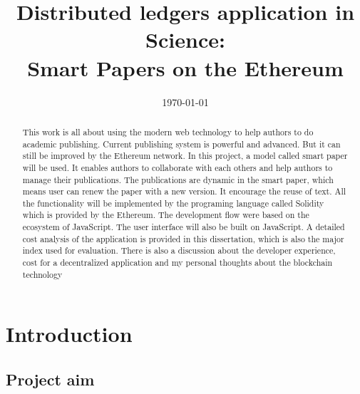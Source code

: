 \documentclass[openany,12pt]{ecsthesis}      %
\begin{document}
\frontmatter
\title      {Distributed ledgers application in Science: \\
Smart Papers on the Ethereum}



\addresses  {\deptname\\\univname}
\date       {\today}
			
\subject    {}
\keywords   {}
\maketitle
\begin{abstract}
This work is all about using the modern web technology to help authors to do academic publishing.
Current publishing system is powerful and advanced. 
But it can still be improved by the Ethereum network. In this project, a model called smart paper will be used. 
It enables authors to collaborate with each others and help authors to manage their publications. 
The publications are dynamic in the smart paper, which means user can renew the paper with a new version. 
It encourage the reuse of text. 
All the functionality will be implemented by the programing language called Solidity which is provided by the Ethereum.
The development flow were based on the ecosystem of JavaScript. The user interface will also be built on JavaScript. 
A detailed cost analysis of the application is provided in this dissertation, 
which is also the major index used for evaluation. 
There is also a discussion about the developer experience, cost for a decentralized application and my personal thoughts about the blockchain technology

\end{abstract}
\setcounter{tocdepth}{3}
\tableofcontents
\listoffigures
\listoftables
\mainmatter
\chapter{Introduction}
\section{Project aim}
\end{document}
